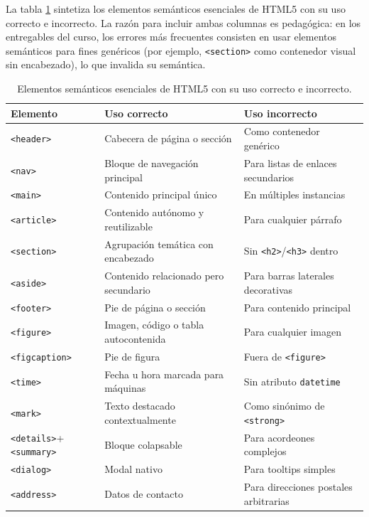 \documentclass[11pt,a4paper,openany]{book}
\begin{document}
La tabla \ref{tab:semanticos} sintetiza los elementos semánticos
esenciales de HTML5 con su uso correcto e incorrecto. La razón
para incluir ambas columnas es pedagógica: en los entregables del
curso, los errores más frecuentes consisten en usar elementos
semánticos para fines genéricos (por ejemplo, \texttt{<section>}
como contenedor visual sin encabezado), lo que invalida su
semántica.

\begin{table}[htbp]
\centering
\caption{Elementos semánticos esenciales de HTML5 con su uso correcto e incorrecto.}
\label{tab:semanticos}
\footnotesize
\begin{tabularx}{\textwidth}{lXX}
\toprule
\textbf{Elemento} & \textbf{Uso correcto} & \textbf{Uso incorrecto}\\
\midrule
\texttt{<header>}  & Cabecera de página o sección & Como contenedor genérico\\
\texttt{<nav>}     & Bloque de navegación principal & Para listas de enlaces secundarios\\
\texttt{<main>}    & Contenido principal único & En múltiples instancias\\
\texttt{<article>} & Contenido autónomo y reutilizable & Para cualquier párrafo\\
\texttt{<section>} & Agrupación temática con encabezado & Sin \texttt{<h2>}/\texttt{<h3>} dentro\\
\texttt{<aside>}   & Contenido relacionado pero secundario & Para barras laterales decorativas\\
\texttt{<footer>}  & Pie de página o sección & Para contenido principal\\
\texttt{<figure>}  & Imagen, código o tabla autocontenida & Para cualquier imagen\\
\texttt{<figcaption>} & Pie de figura & Fuera de \texttt{<figure>}\\
\texttt{<time>}    & Fecha u hora marcada para máquinas & Sin atributo \texttt{datetime}\\
\texttt{<mark>}    & Texto destacado contextualmente & Como sinónimo de \texttt{<strong>}\\
\texttt{<details>}+\texttt{<summary>} & Bloque colapsable & Para acordeones complejos\\
\texttt{<dialog>}  & Modal nativo & Para tooltips simples\\
\texttt{<address>} & Datos de contacto & Para direcciones postales arbitrarias\\
\bottomrule
\end{tabularx}
\end{table}
\end{document}
